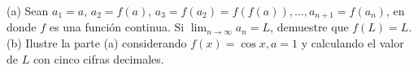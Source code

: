 \item (a) Sean $a_1 = a$, $a_2 = f(a)$, $a_3 = f(a_2) = f(f(a)), \dots, a_{n+1} = f(a_n)$, en donde $f$ es una función continua. Si $\lim_{n \to \infty} a_n = L$, demuestre que $f(L) = L$. \\
    (b) Ilustre la parte (a) considerando $f(x) = \cos x, a = 1$ y calculando el valor de $L$ con cinco cifras decimales.
